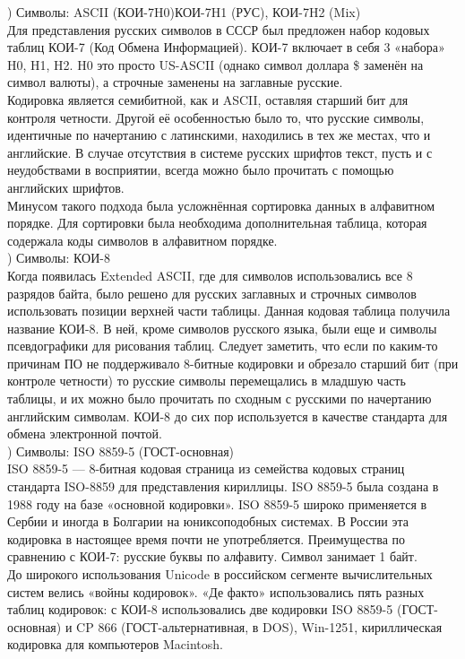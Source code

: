 ) Символы: ASCII (КОИ-7H0)КОИ-7H1 (РУС), КОИ-7H2 (Mix) \\
Для представления русских символов в СССР был предложен набор кодовых таблиц КОИ-7 (Код Обмена Информацией). КОИ-7 включает в себя 3 «набора» H0, H1, H2. H0 это просто US-ASCII (однако символ доллара \$ заменён на символ валюты), а строчные заменены на заглавные русские. \\
Кодировка является семибитной, как и ASCII, оставляя старший бит для контроля четности. Другой её особенностью было то, что русские символы, идентичные по начертанию с латинскими, находились в тех же местах, что и английские. В случае отсутствия в системе русских шрифтов текст, пусть и с неудобствами в восприятии, всегда можно было прочитать с помощью английских шрифтов. \\
Минусом такого подхода была усложнённая сортировка данных в алфавитном порядке. Для сортировки была необходима дополнительная таблица, которая содержала коды символов в алфавитном порядке. \\

) Символы: КОИ-8 \\
Когда появилась Extended ASCII, где для символов использовались все 8 разрядов байта, было решено для русских заглавных и строчных символов использовать позиции верхней части таблицы. Данная кодовая таблица получила название КОИ-8. В ней, кроме символов русского языка, были еще и символы псевдографики для рисования таблиц.
Следует заметить, что если по каким-то причинам ПО не поддерживало 8-битные кодировки и обрезало старший бит (при контроле четности) то русские символы перемещались в младшую часть таблицы, и их можно было прочитать по сходным с русскими по начертанию английским символам. КОИ-8 до сих пор используется в качестве стандарта для обмена электронной почтой. \\

) Символы: ISO 8859-5 (ГОСТ-основная) \\
ISO 8859-5 — 8-битная кодовая страница из семейства кодовых страниц стандарта ISO-8859 для представления кириллицы. ISO 8859-5 была создана в 1988 году на базе «основной кодировки». ISO 8859-5 широко применяется в Сербии и иногда в Болгарии на юниксоподобных системах. В России эта кодировка в настоящее время почти не употребляется. Преимущества по сравнению с КОИ-7: русские буквы по алфавиту. Символ занимает 1 байт. \\
До широкого использования Unicode в российском сегменте вычислительных систем велись «войны кодировок». «Де факто» использовались пять разных таблиц кодировок: с КОИ-8 использовались две кодировки ISO 8859-5 (ГОСТ-основная) и CP 866 (ГОСТ-альтернативная, в DOS), Win-1251, кириллическая кодировка для компьютеров Macintosh.  \\

